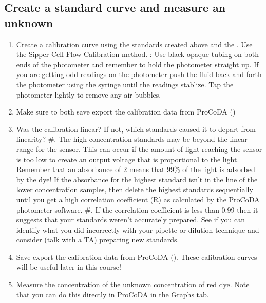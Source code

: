 \documentclass[letterpaper,10pt,english]{sphinxmanual}
\begin{document}
\subsection{Create a standard curve and measure an unknown}
\label{\detokenize{Laboratory_Measurements/Laboratory_Measurements:create-a-standard-curve-and-measure-an-unknown}}\begin{enumerate}
\item {} 
Create a calibration curve using the standards created above and the {\hyperref[\detokenize{ProCoDA/ProCoDA:heading-procoda-photometer}]{}}. Use the Sipper Cell Flow Calibration method. : Use black opaque tubing on both ends of the photometer and remember to hold the photometer straight up. If you are getting odd readings on the photometer push the fluid back and forth the photometer using the syringe until the readings stablize. Tap the photometer lightly to remove any air bubbles.

\item {} 
Make sure to both save  export the calibration data from ProCoDA ()

\item {} 
Was the calibration linear? If not, which standards caused it to depart from linearity?
\#. The high concentration standards may be beyond the linear range for the sensor. This can occur if the amount of light reaching the sensor is too low to create an output voltage that is proportional to the light. Remember that an absorbance of 2 means that 99\% of the light is adsorbed by the dye! If the absorbance for the highest standard isn’t in the line of the lower concentration samples, then delete the highest standards sequentially until you get a high correlation coefficient (R) as calculated by the ProCoDA photometer software.
\#. If the correlation coefficient is less than 0.99 then it suggests that your standards weren’t accurately prepared. See if you can identify what you did incorrectly with your pipette or dilution technique and consider (talk with a TA) preparing new standards.

\item {} 
Save  export the calibration data from ProCoDA (). These calibration curves will be useful later in this course!

\item {} 
Measure the concentration of the unknown concentration of red dye. Note that you can do this directly in ProCoDA in the Graphs tab.

\end{enumerate}
\end{document}
